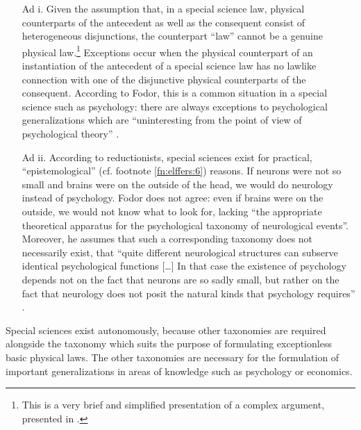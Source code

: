 \documentclass[output=paper]{langscibook}
\begin{document}
\begin{enumerate}
    \item[Ad i.] Given the assumption that, in a special science law, physical counterparts of the antecedent as well as the consequent consist of heterogeneous disjunctions, the counterpart ``law'' cannot be a genuine physical law.\footnote{This is a very brief and simplified presentation of a complex argument, presented in \citet[109]{Fodor1974}.} Exceptions occur when the physical counterpart of an instantiation of the antecedent of a special science law has no lawlike connection with one of the disjunctive physical counterparts of the consequent. According to Fodor, this is a common situation in a special science such as psychology: there are always exceptions to psychological generalizations which are  ``uninteresting from the point of view of psychological theory'' \citep[111]{Fodor1974}.

    \item[Ad ii.] According to reductionists, special sciences exist for practical, ``epistemological'' (cf. footnote \ref{fn:elffers:6}) reasons. If neurons were not so small and brains were on the outside of the head, we would do neurology instead of psychology. Fodor does not agree: even if brains were on the outside, we would not know what to look for, lacking ``the appropriate theoretical apparatus for the psychological taxonomy of neurological events''. Moreover, he assumes that such a corresponding taxonomy does not necessarily exist, that ``quite different neurological structures can subserve identical psychological functions […] In that case the existence of psychology depends not on the fact that neurons are so sadly small, but rather on the fact that neurology does not posit the natural kinds that psychology requires'' \citep[113]{Fodor1974}.
\end{enumerate}

Special sciences exist autonomously, because other taxonomies are required alongside the taxonomy which suits the purpose of formulating exceptionless basic physical laws. The other taxonomies are necessary for the formulation of important generalizations in areas of knowledge such as psychology or economics.
\end{document}
